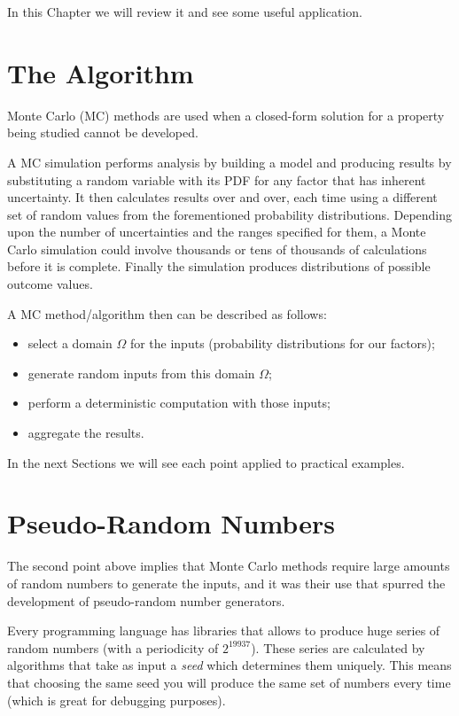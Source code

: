 In this Chapter we will review it and see some useful application.

\section{The Algorithm}\label{whats-monte-carlo-simulation}

Monte Carlo (MC) methods are used when a closed-form solution for a
property being studied cannot be developed.

A MC simulation performs analysis by building a model and producing 
results by substituting a random variable with its PDF
for any factor that has inherent uncertainty. 
It then calculates results over and over, each time using a different set of
random values from the forementioned probability distributions. 
Depending upon the number of uncertainties and the ranges specified for them,
a Monte Carlo simulation could involve thousands or tens of thousands of
calculations before it is complete. Finally the simulation
produces distributions of possible outcome values.

A MC method/algorithm then can be described as follows: 
\begin{itemize}
	\item  select a domain \(\Omega\) for the inputs (probability distributions for our
	factors); 
	\item generate random inputs from this domain \(\Omega\);
	\item perform
	a deterministic computation with those inputs;
	\item aggregate the results.
\end{itemize}

In the next Sections we will see each point applied to practical examples.

\section{Pseudo-Random Numbers}\label{pseudo-random-numbers}

The second point above implies that Monte Carlo methods require 
large amounts of random numbers to
generate the inputs, and it was their use that spurred the development
of pseudo-random number generators. 

Every programming language has libraries that
allows to produce huge series of random numbers (with a periodicity of
\(2^{19937}\)). These series are calculated by algorithms that take as
input a \emph{seed} which determines them uniquely. This means
that choosing the same seed you will produce the same set of numbers
every time (which is great for debugging purposes).

